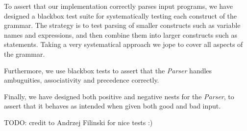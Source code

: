 To assert that our implementation correctly parses input programs, we have designed a blackbox test suite for systematically testing each construct of the grammar.
The strategy is to test parsing of smaller constructs such as variable names and expressions, and then combine them into larger constructs such as statements.
Taking a very systematical approach we jope to cover all aspects of the grammar.

Furthermore, we use blackbox tests to assert that the \textit{Parser} handles ambuguities, associativity and precedence correctly.

Finally, we have designed both positive and negative nests for the \textit{Parser}, to assert that it behaves as intended when given both good and bad input.

TODO: credit to Andrzej Filinski for nice tests :)
